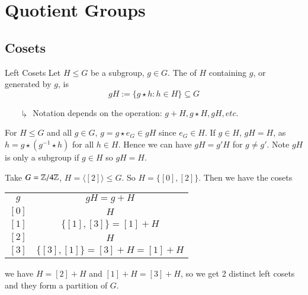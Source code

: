 \documentclass[12pt, a4paper, twoside, openright, titlepage]{book}
\begin{document}
\chapter{\textsection\textsection Quotient Groups}

\section{\textsection Cosets}

\begin{defn}{Left Cosets}{}
        Let $H \leq G$ be a subgroup, $g \in G$. The  of $H$ containing $g$, or generated by $g$, is \begin{equation}
                gH := \{g\star h:h\in H\}\subseteq G
        \end{equation}
\end{defn}
\begin{enumerate}
        \item[$\drsh$] Notation depends on the operation: $g+H, g\star H, gH, etc.$
\end{enumerate}

\begin{note*}{}{}
        For $H \leq G$ and all $g \in G$, $g = g\star e_G \in gH$ since $e_G \in H$. If $g \in H$, $gH = H$, as $h = g \star (g^{-1} \star h)$ for all $h \in H$. Hence we can have $gH = g'H$ for $g \neq g'$. Note $gH$ is only a subgroup if $g \in H$ so $gH = H$.
\end{note*}

\begin{eg}{}{}
        Take $G = \mathbb Z/4\mathbb Z$, $H = \langle [2]\rangle \leq G$. So $H = \{[0], [2]\}$. Then we have the cosets \begin{table}[H]
                \centering
                \begin{tabular}{cc}
                        $g$ & $gH = g+H$ \\
                        $[0]$ & $H$ \\
                        $[1]$ & $\{ [1],[3] \} = [1] +H$\\
                        $[2]$ & $H$ \\
                        $[3]$ & $\{[3], [1]\} = [3]+H = [1] +H$
                \end{tabular}
        \end{table}
        we have $H = [2]+H$ and $[1]+H = [3]+H$, so we get 2 distinct left cosets and they form a partition of $G$.
\end{eg}
\end{document}

